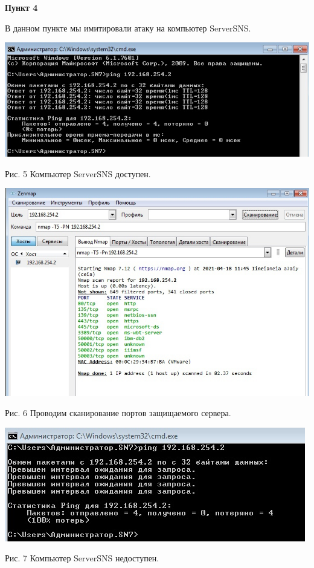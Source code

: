 \documentclass[a4paper,14pt]{extarticle}
\begin{document}
    \textbf{Пункт 4}
    \vspace{-3ex}
    \begin{center}
        \singlespacing
        В данном пункте мы имитировали атаку на компьютер ServerSNS.

        \includegraphics[scale=0.6]{pics/4_1.jpg}
        
        Рис. 5 Компьютер ServerSNS доступен.

        \includegraphics[scale=0.6]{pics/4_2.jpg}

        Рис. 6 Проводим сканирование портов защищаемого сервера.

        \includegraphics[scale=0.7]{pics/4_3.jpg}

        Рис. 7 Компьютер ServerSNS недоступен.

    \end{center}
\end{document}
